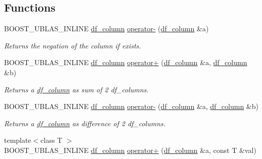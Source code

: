 \subsection*{Functions}
\begin{DoxyCompactItemize}
\item 
B\+O\+O\+S\+T\+\_\+\+U\+B\+L\+A\+S\+\_\+\+I\+N\+L\+I\+NE \hyperlink{classboost_1_1numeric_1_1ublas_1_1df__column}{df\+\_\+column} \hyperlink{namespaceboost_1_1numeric_1_1ublas_af2e56c266ca040ab2f8aa591307dc5ce}{operator-\/} (\hyperlink{classboost_1_1numeric_1_1ublas_1_1df__column}{df\+\_\+column} \&a)
\begin{DoxyCompactList}\small\item\em Returns the negation of the column if exists. \end{DoxyCompactList}\item 
B\+O\+O\+S\+T\+\_\+\+U\+B\+L\+A\+S\+\_\+\+I\+N\+L\+I\+NE \hyperlink{classboost_1_1numeric_1_1ublas_1_1df__column}{df\+\_\+column} \hyperlink{namespaceboost_1_1numeric_1_1ublas_a65a9cb5bb193dd3b0e60a0322f983492}{operator+} (\hyperlink{classboost_1_1numeric_1_1ublas_1_1df__column}{df\+\_\+column} \&a, \hyperlink{classboost_1_1numeric_1_1ublas_1_1df__column}{df\+\_\+column} \&b)
\begin{DoxyCompactList}\small\item\em Returns a \hyperlink{classboost_1_1numeric_1_1ublas_1_1df__column}{df\+\_\+column} as sum of 2 df\+\_\+columns. \end{DoxyCompactList}\item 
B\+O\+O\+S\+T\+\_\+\+U\+B\+L\+A\+S\+\_\+\+I\+N\+L\+I\+NE \hyperlink{classboost_1_1numeric_1_1ublas_1_1df__column}{df\+\_\+column} \hyperlink{namespaceboost_1_1numeric_1_1ublas_acdc4d942c740ceaaabe541603885c4eb}{operator-\/} (\hyperlink{classboost_1_1numeric_1_1ublas_1_1df__column}{df\+\_\+column} \&a, \hyperlink{classboost_1_1numeric_1_1ublas_1_1df__column}{df\+\_\+column} \&b)
\begin{DoxyCompactList}\small\item\em Returns a \hyperlink{classboost_1_1numeric_1_1ublas_1_1df__column}{df\+\_\+column} as difference of 2 df\+\_\+columns. \end{DoxyCompactList}\item 
{\footnotesize template$<$class T $>$ }\\B\+O\+O\+S\+T\+\_\+\+U\+B\+L\+A\+S\+\_\+\+I\+N\+L\+I\+NE \hyperlink{classboost_1_1numeric_1_1ublas_1_1df__column}{df\+\_\+column} \hyperlink{namespaceboost_1_1numeric_1_1ublas_aab7910174f8fec8d67ddf60450647378}{operator+} (\hyperlink{classboost_1_1numeric_1_1ublas_1_1df__column}{df\+\_\+column} \&a, const T \&val)

\end{DoxyCompactItemize}

